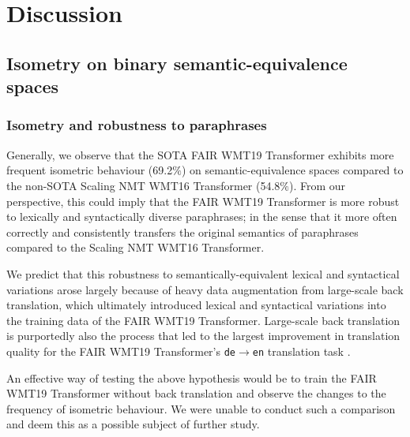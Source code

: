 \documentclass[11pt,a4paper]{article}
\begin{document}
\section{Discussion}

\subsection{Isometry on binary semantic-equivalence spaces}

\subsubsection{Isometry and robustness to paraphrases}

Generally, we observe that the SOTA FAIR WMT19 Transformer exhibits more frequent isometric behaviour (69.2$\%$) on semantic-equivalence spaces compared to the non-SOTA Scaling NMT WMT16 Transformer (54.8$\%$). From our perspective, this could imply that the FAIR WMT19 Transformer is more robust to lexically and syntactically diverse paraphrases; in the sense that it more often correctly and consistently transfers the original semantics of paraphrases compared to the Scaling NMT WMT16 Transformer.

We predict that this robustness to semantically-equivalent lexical and syntactical variations arose largely because of heavy data augmentation from large-scale back translation, which ultimately introduced lexical and syntactical variations into the training data of the FAIR WMT19 Transformer. Large-scale back translation is purportedly also the process that led to the largest improvement in translation quality for the FAIR WMT19 Transformer's \texttt{de$\rightarrow$en} translation task \cite{ng2019facebook}.

An effective way of testing the above hypothesis would be to train the FAIR WMT19 Transformer without back translation and observe the changes to the frequency of isometric behaviour. We were unable to conduct such a comparison and deem this as a possible subject of further study. 
\end{document}
